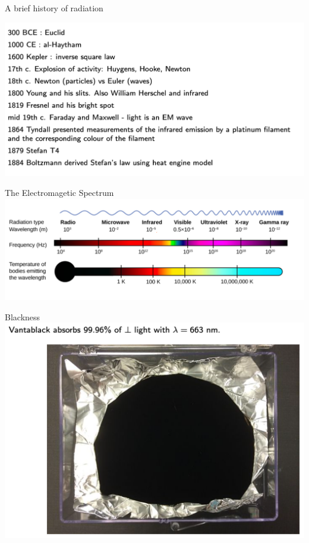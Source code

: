 \begin{frame}{A brief history of radiation}
\small

\includegraphics[scale=0.35]{briefhistory}

\end{frame}


\begin{frame}{The Electromagetic Spectrum}
\small
\includegraphics[scale=0.35]{emspectrum}
\end{frame}

\begin{frame}{Blackness}
\small
\includegraphics[scale=0.35]{vantablack}
\end{frame}

